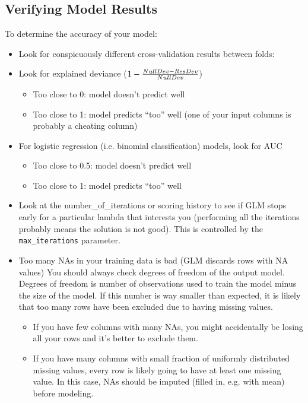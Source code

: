 \subsection{Verifying Model Results}

To determine the accuracy of your model: 

\begin{itemize}
\item Look for conspicuously different cross-validation results between folds:
\waterExampleInR


\item Look for explained deviance ($1 - {NullDev - ResDev \over NullDev}$)  
      \begin{itemize}
      \item Too close to 0:  model doesn’t predict well
      \item Too close to 1:  model predicts “too” well (one of your input columns is probably a cheating column)
      \end{itemize}
\item For logistic regression (i.e. binomial classification) models, look for AUC
      \begin{itemize}
      \item Too close to 0.5:  model doesn’t predict well
      \item Too close to 1:  model predicts “too” well
      \end{itemize}
\item Look at the number\_of\_iterations or scoring history to see if GLM stops early for a particular
      lambda that interests you (performing all the iterations probably means the solution is not good).  This is
      controlled by the \texttt{max\_iterations} parameter.
\item Too many NAs in your training data is bad (GLM discards rows with NA values)
     You should always check degrees of freedom of the output model. Degrees of freedom is number of observations used to train the model minus the size of the model. If this number is way smaller than expected, it is likely that too many rows have been excluded due to having missing values. 

      \begin{itemize}
      \item If you have few columns with many NAs, you might accidentally be losing all your rows and it's better to exclude them.
      \item If you have many columns with small fraction of uniformly distributed missing values, every row is likely going to have at least one missing value. In this case, NAs should be imputed (filled in, e.g. with mean) before modeling.
      \end{itemize}
\end{itemize}

